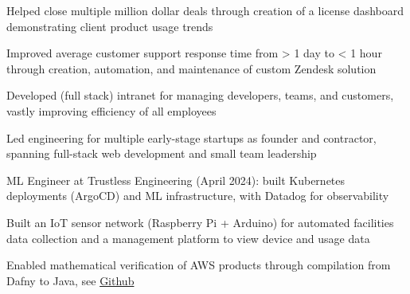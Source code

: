 \documentclass[print]{jack-resume}
\begin{document}
\begin{tightemize}
    \item Helped close multiple million dollar deals through creation of a license dashboard demonstrating client product usage trends
    \item Improved average customer support response time from > 1 day to < 1 hour through creation, automation, and maintenance of custom Zendesk solution
    \item Developed (full stack) intranet for managing developers, teams, and customers, vastly improving efficiency of all employees
\end{tightemize}
\sectionsep

\begin{tightemize}
    \item Led engineering for multiple early-stage startups as founder and contractor, spanning full-stack web development and small team leadership
    \item ML Engineer at Trustless Engineering (April 2024): built Kubernetes deployments (ArgoCD) and ML infrastructure, with Datadog for observability
\end{tightemize}
\sectionsep

\begin{tightemize}
    \item Built an IoT sensor network (Raspberry Pi + Arduino) for automated facilities data collection and a management platform to view device and usage data
\end{tightemize}

\begin{tightemize}
    \item Enabled mathematical verification of AWS products through compilation from Dafny to Java, see \href{https://github.com/dafny-lang/dafny}{Github \ExternalLink}
\end{tightemize}
\sectionsep
\end{document}
